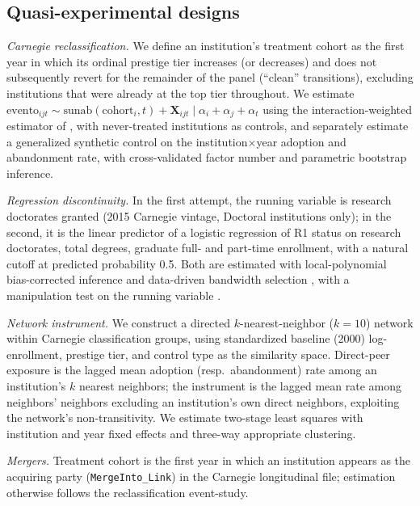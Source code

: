 \documentclass[11pt, letterpaper]{article}
\newcommand{\parencite}[1]{\cite{#1}}
\newcommand{\textcite}[1]{\cite{#1}}
\begin{document}
\subsection*{Quasi-experimental designs}

\emph{Carnegie reclassification.} We define an institution's treatment cohort as the first year in which its ordinal prestige tier increases (or decreases) and does not subsequently revert for the remainder of the panel (``clean'' transitions), excluding institutions that were already at the top tier throughout. We estimate $\mathrm{evento}_{ijt} \sim \mathrm{sunab}(\mathrm{cohort}_i, t) + \mathbf{X}_{ijt} \mid \alpha_i + \alpha_j + \alpha_t$ using the interaction-weighted estimator of \textcite{sunabraham2021}, with never-treated institutions as controls, and separately estimate a generalized synthetic control \parencite{xu2017} on the institution$\times$year adoption and abandonment rate, with cross-validated factor number and parametric bootstrap inference.

\emph{Regression discontinuity.} In the first attempt, the running variable is research doctorates granted (2015 Carnegie vintage, Doctoral institutions only); in the second, it is the linear predictor of a logistic regression of R1 status on research doctorates, total degrees, graduate full- and part-time enrollment, with a natural cutoff at predicted probability 0.5. Both are estimated with local-polynomial bias-corrected inference and data-driven bandwidth selection \parencite{calonico2014}, with a manipulation test on the running variable \parencite{cattaneo2020density}.

\emph{Network instrument.} We construct a directed $k$-nearest-neighbor ($k=10$) network within Carnegie classification groups, using standardized baseline (2000) log-enrollment, prestige tier, and control type as the similarity space. Direct-peer exposure is the lagged mean adoption (resp.\ abandonment) rate among an institution's $k$ nearest neighbors; the instrument is the lagged mean rate among neighbors' neighbors excluding an institution's own direct neighbors, exploiting the network's non-transitivity. We estimate two-stage least squares with institution and year fixed effects and three-way appropriate clustering.

\emph{Mergers.} Treatment cohort is the first year in which an institution appears as the acquiring party (\texttt{MergeInto\_Link}) in the Carnegie longitudinal file; estimation otherwise follows the reclassification event-study.
\end{document}
